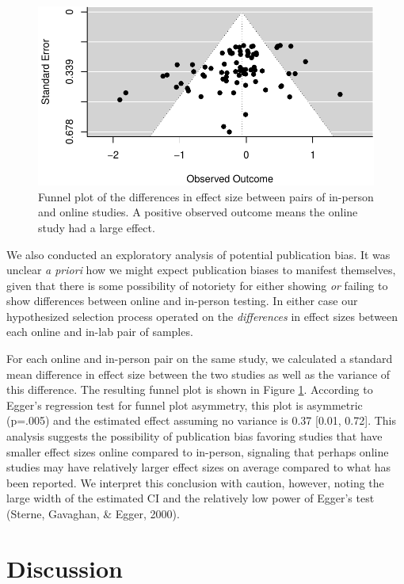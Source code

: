 \documentclass[
  man,floatsintext]{apa6}
\begin{document}
\begin{figure}[h]

{\centering \includegraphics[width=0.8\linewidth]{OnlineMA_main_files/figure-latex/funnel-1} 

}

\caption{Funnel plot of the differences in effect size between pairs of in-person and online studies. A positive observed outcome means the online study had a large effect. \label{funnel}}\label{fig:funnel}
\end{figure}

We also conducted an exploratory analysis of potential publication bias. It was unclear \emph{a priori} how we might expect publication biases to manifest themselves, given that there is some possibility of notoriety for either showing \emph{or} failing to show differences between online and in-person testing. In either case our hypothesized selection process operated on the \emph{differences} in effect sizes between each online and in-lab pair of samples.

For each online and in-person pair on the same study, we calculated a standard mean difference in effect size between the two studies as well as the variance of this difference. The resulting funnel plot is shown in Figure \ref{fig:funnel}. According to Egger's regression test for funnel plot asymmetry, this plot is asymmetric (p=.005) and the estimated effect assuming no variance is 0.37 {[}0.01, 0.72{]}. This analysis suggests the possibility of publication bias favoring studies that have smaller effect sizes online compared to in-person, signaling that perhaps online studies may have relatively larger effect sizes on average compared to what has been reported. We interpret this conclusion with caution, however, noting the large width of the estimated CI and the relatively low power of Egger's test (Sterne, Gavaghan, \& Egger, 2000).

\hypertarget{discussion}{%
\section{Discussion}\label{discussion}}
\end{document}
